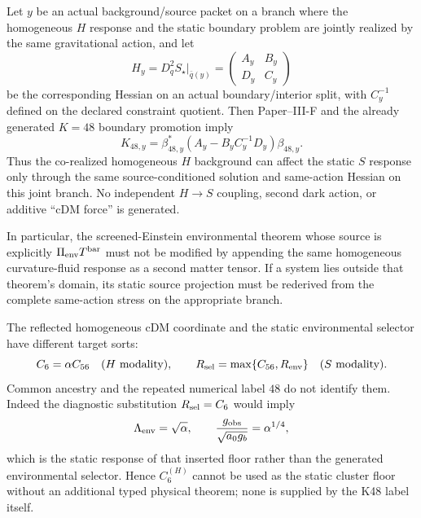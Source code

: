 \documentclass[12pt,a4paper]{article}
\begin{document}
\begin{corollary}
\label{p8:cor:v2119-hs-same-action-schur}
Let $y$ be an actual background/source packet on a branch where the homogeneous
$H$ response and the static boundary problem are jointly realized by the same
gravitational action, and let
\[
 H_y=D_q^2S_\star|_{\bar q(y)}
 =\begin{pmatrix}A_y&B_y\\D_y&C_y\end{pmatrix}
\]
be the corresponding Hessian on an actual boundary/interior split, with
$C_y^{-1}$ defined on the declared constraint quotient.  Then Paper--III-F
and the already generated $K=48$ boundary promotion imply
\begin{equation}
 \label{p8:eq:v2119-hs-schur}
 \boxed{
 K_{48,y}
 =\beta_{48,y}^{*}
 \left(A_y-B_yC_y^{-1}D_y\right)
 \beta_{48,y}.}
\end{equation}
Thus the co-realized homogeneous $H$ background can affect the static $S$
response only through the same source-conditioned solution and same-action
Hessian on this joint branch.  No independent $H\to S$ coupling, second dark
action, or additive ``cDM force'' is generated.

In particular, the screened-Einstein environmental theorem whose source is
explicitly $\Pi_{\rm env}T^{\rm bar}$ must not be modified by appending the
same homogeneous curvature-fluid response as a second matter tensor.  If a
system lies outside that theorem's domain, its static source projection must
be rederived from the complete same-action stress on the appropriate branch.
\end{corollary}

\begin{corollary}
\label{p8:cor:v2119-c6-not-static-floor}
The reflected homogeneous cDM coordinate and the static environmental selector
have different target sorts:
\[
 C_6=\alpha C_{56}
 \quad(H\text{ modality}),
 \qquad
 R_{\rm sel}=\max\{C_{56},R_{\rm env}\}
 \quad(S\text{ modality}).
\]
Common ancestry and the repeated numerical label $48$ do not identify them.
Indeed the diagnostic substitution $R_{\rm sel}=C_6$ would imply
\[
 \Lambda_{\rm env}=\sqrt\alpha,
 \qquad
 \frac{g_{\rm obs}}{\sqrt{a_0g_b}}=\alpha^{1/4},
\]
which is the static response of that inserted floor rather than the generated
environmental selector.  Hence $C_6^{(H)}$ cannot be used as the static cluster
floor without an additional typed physical theorem; none is supplied by the
K48 label itself.
\end{corollary}
\end{document}
